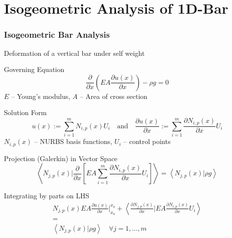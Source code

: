 \documentclass{beamer}
\newcommand{\pd}[2]{\frac{\partial #1}{\partial #2}}
\begin{document}
\section{Isogeometric Analysis of 1D-Bar}
\begin{frame}[allowframebreaks] \frametitle{Isogeometric Bar Analysis}
  Deformation of a vertical bar under self weight

  \begin{block}{Governing Equation}
    \begin{equation}\nonumber
      \pd{}{x} \left( EA \pd{u(x)}{x} \right) - \rho g  = 0
    \end{equation}
    $E$ -- Young's modulus, $A$ -- Area of cross section
  \end{block}
  
  \begin{block}{Solution Form}
    \begin{equation}\nonumber
      u(x) := \sum_{i=1}^{m} N_{i,p}(x) U_i  \quad \mathrm{and} \quad \pd{u(x)}{x} := \sum_{i=1}^{m} \pd{N_{i,p}(x)}{x}  U_i
    \end{equation}
    $N_{i,p}(x)$ --  NURBS basis functions, $U_i$ -- control points
  \end{block}

  \begin{block}{Projection (Galerkin) in Vector Space}
    \begin{equation}\nonumber
      \left\langle  N_{j,p}(x) \bigg\vert \pd{}{x} \left[ EA \sum_{i=1}^{m} \pd{N_{i,p}(x)}{x}  U_i  \right] \right\rangle  =
      \left\langle N_{j,p}(x) \bigg\vert \rho g \right\rangle 
    \end{equation}
  \end{block}
  \begin{block}{Integrating by parts on LHS}
    \begin{equation}\nonumber
      \begin{gathered}
        N_{j,p}(x) EA \pd{u(x)}{x}  \bigg\vert_{x_a}^{x_b} +  \left\langle \pd{N_{j,p}(x)}{x}  \bigg\vert  EA  \pd{N_{i,p}(x)}{x}  U_i   \right\rangle \\
        = \\
        \left\langle N_{j,p}(x) \bigg\vert \rho g \right\rangle \quad \forall j = 1, \ldots,m
      \end{gathered}
    \end{equation}
  \end{block}


\end{frame}
\end{document}
